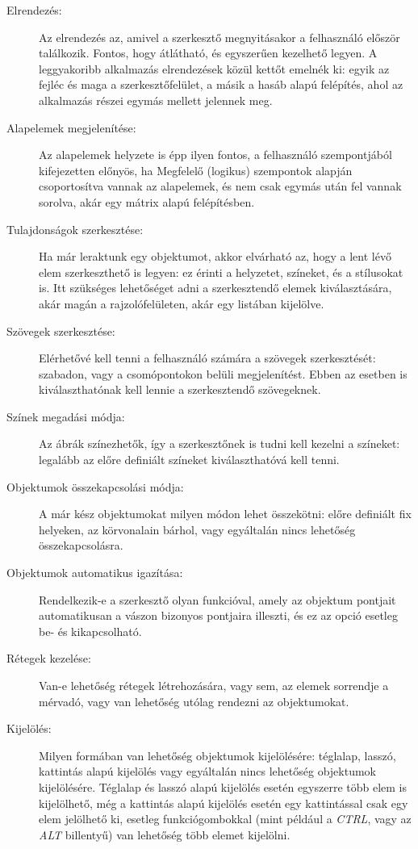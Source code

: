 \begin{description}
	\item[Elrendezés:] Az elrendezés az, amivel a szerkesztő megnyitásakor a felhasználó először találkozik. Fontos, hogy átlátható, és egyszerűen kezelhető legyen. A leggyakoribb alkalmazás elrendezések közül kettőt emelnék ki: egyik az fejléc és maga a szerkesztőfelület, a másik a hasáb alapú felépítés, ahol az alkalmazás részei egymás mellett jelennek meg. 
	\item[Alapelemek megjelenítése:] Az alapelemek helyzete is épp ilyen fontos, a felhasználó szempontjából kifejezetten előnyös, ha Megfelelő (logikus) szempontok alapján csoportosítva vannak az alapelemek, és nem csak egymás után fel vannak sorolva, akár egy mátrix alapú felépítésben.
	\item[Tulajdonságok szerkesztése:] Ha már leraktunk egy objektumot, akkor elvárható az, hogy a lent lévő elem szerkeszthető is legyen: ez érinti a helyzetet, színeket, és a stílusokat is. Itt szükséges lehetőséget adni a szerkesztendő elemek kiválasztására, akár magán a rajzolófelületen, akár egy listában kijelölve.
	\item[Szövegek szerkesztése:] Elérhetővé kell tenni a felhasználó számára a szövegek szerkesztését: szabadon, vagy a csomópontokon belüli megjelenítést. Ebben az esetben is kiválaszthatónak kell lennie a szerkesztendő szövegeknek.
	\item[Színek megadási módja:] Az ábrák színezhetők, így a szerkesztőnek is tudni kell kezelni a színeket: legalább az előre definiált színeket kiválaszthatóvá kell tenni.
	\item[Objektumok összekapcsolási módja:] A már kész objektumokat milyen módon lehet összekötni: előre definiált fix helyeken, az körvonalain bárhol, vagy egyáltalán nincs lehetőség összekapcsolásra. 
	\item[Objektumok automatikus igazítása:] Rendelkezik-e a szerkesztő olyan funkcióval, amely az objektum pontjait automatikusan a vászon bizonyos pontjaira illeszti, és ez az opció esetleg be- és kikapcsolható.
	\item[Rétegek kezelése:] Van-e lehetőség rétegek létrehozására, vagy sem, az elemek sorrendje a mérvadó, vagy van lehetőség utólag rendezni az objektumokat. 
	\item[Kijelölés:] Milyen formában van lehetőség objektumok kijelölésére: téglalap, lasszó, kattintás alapú kijelölés vagy egyáltalán nincs lehetőség objektumok kijelölésére. Téglalap és lasszó alapú kijelölés esetén egyszerre több elem is kijelölhető, még a kattintás alapú kijelölés esetén egy kattintással csak egy elem jelölhető ki, esetleg funkciógombokkal (mint például a \textit{CTRL}, vagy az \textit{ALT} billentyű) van lehetőség több elemet kijelölni.

\end{description}
